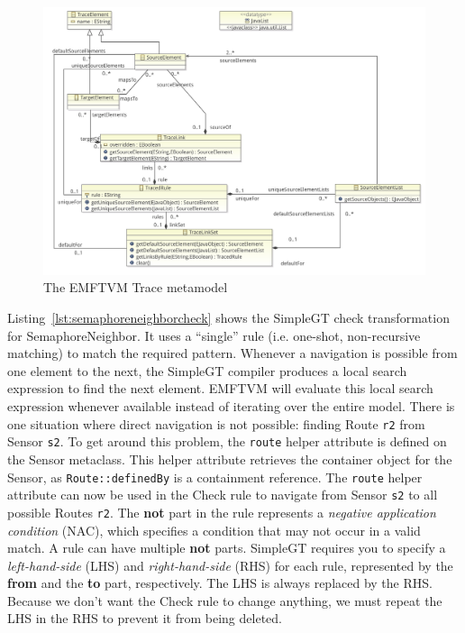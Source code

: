 \documentclass[submission,copyright,creativecommons]{eptcs}
\begin{document}
\begin{figure}[ht]
\centerline{
\includegraphics[width=15cm]{figures/trace}}
\caption{The EMFTVM Trace metamodel}
\label{fig:emftvm-trace}
\end{figure}

Listing~\ref{lst:semaphoreneighborcheck} shows the SimpleGT check transformation for SemaphoreNeighbor. It uses a ``single'' rule (i.e. one-shot, non-recursive matching) to match the required pattern. Whenever a navigation is possible from one element to the next, the SimpleGT compiler produces a local search expression to find the next element. EMFTVM will evaluate this local search expression whenever available instead of iterating over the entire model. There is one situation where direct navigation is not possible: finding Route \texttt{r2} from Sensor \texttt{s2}. To get around this problem, the \texttt{route} helper attribute is defined on the Sensor metaclass. This helper attribute retrieves the container object for the Sensor, as \texttt{Route::definedBy} is a containment reference. The \texttt{route} helper attribute can now be used in the Check rule to navigate from Sensor \texttt{s2} to all possible Routes \texttt{r2}. The \textbf{not} part in the rule represents a \emph{negative application condition} (NAC), which specifies a condition that may not occur in a valid match. A rule can have multiple \textbf{not} parts. SimpleGT requires you to specify a \emph{left-hand-side} (LHS) and \emph{right-hand-side} (RHS) for each rule, represented by the \textbf{from} and the \textbf{to} part, respectively. The LHS is always replaced by the RHS. Because we don't want the Check rule to change anything, we must repeat the LHS in the RHS to prevent it from being deleted.
\end{document}

